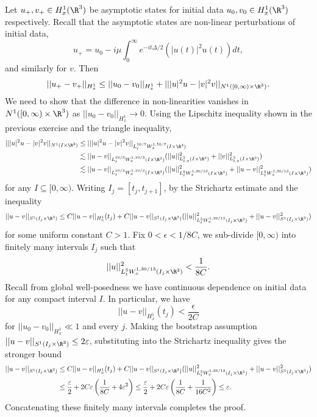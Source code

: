 \begin{solution}
	Let $u_+, v_+ \in H^1_x (\R^3)$ be asymptotic states for initial data $u_0, v_0 \in H^1_x (\R^3)$ respectively. Recall that the asymptotic states are non-linear perturbations of initial data,
		\[ u_+ = u_0 - i \mu \int_0^\infty e^{-it \Delta/2} (|u(t)|^2 u(t)) dt,\]
	and similarly for $v$. Then 
		\[ ||u_+ - v_+||_{H^1_x} \leq ||u_0 - v_0||_{H^1_x} + |||u|^2 u - |v|^2 v||_{N^1 ([0, \infty) \times \R^3)}. \]		
	We need to show that the difference in non-linearities vanishes in $N^1 ([0, \infty) \times \R^3)$ as $||u_0 - v_0||_{H^1_x} \to 0$. Using the Lipschitz inequality shown in the previous exercise and the triangle inequality, 
			\begin{align*}
				|| |u|^2 u - |v|^2 v||_{N^1 (I \times \R^3)}
					&\leq || |u|^2 u - |v|^2 v||_{L^{10/7}_t W^{1, 10/7}_x (I \times \R^3)}\\
					&\lesssim ||u - v||_{L^{10/3}_t W^{1, 10/3}_x (I \times \R^3)} (||u||^2_{L^5_{t, x}  (I \times \R^3)} + ||v||^2_{L^5_{t, x}  (I \times \R^3)} ) \\
					&\lesssim ||u - v||_{L^{10/3}_t W^{1, 10/3}_x (I \times \R^3)} (||u||^2_{L^5_{t} W^{1, 30/13}_x  (I \times \R^3)} + ||u - v||^2_{L^5_{t} W^{1, 30/13}_x  (I \times \R^3)} ) 
			\end{align*}		
	for any $I \subseteq [0, \infty)$. Writing $I_j = [t_j, t_{j + 1}]$, by the Strichartz estimate and the inequality
		\[ ||u - v||_{S^1 (I_j \times \R^3)} \leq C ||u - v||_{H^1_x} (t_j) + C ||u - v||_{S^1 (I_j \times \R^3)} (||u||^2_{L^5_t W^{1, 30/13}_x (I_j\times \R^3)} + ||u - v||^2_{S^1(I_j \times \R^3)}) \]
	for some uniform constant $C > 1$. Fix $0 < \epsilon < 1/8C$, we sub-divide $[0, \infty)$ into finitely many intervals $I_j$ such that
		\[ ||u||^2_{L^5_{t} W^{1, 30/13}_x  (I_j \times \R^3)} < \frac{1}{8C}.\]
	Recall from global well-posedness we have continuous dependence on initial data for any compact interval $I$. In particular, we have
		\[ ||u - v||_{H^1_x} (t_j) < \frac{\epsilon}{2C} \]
	for $||u_0 - v_0||_{H^1_x} \ll 1$ and every $j$. Making the bootstrap assumption $||u - v||_{S^1 (I_j \times \R^3)} \leq 2 \epsilon$, substituting into the Strichartz inequality gives the stronger bound
		\begin{align*}
			  ||u - v||_{S^1 (I_j \times \R^3)} 
			  	&\leq C ||u - v||_{H^1_x} (t_j) + C ||u - v||_{S^1 (I_j \times \R^3)} (||u||^2_{L^5_t W^{1, 30/13}_x (I_j\times \R^3)} + ||u - v||^2_{S^1(I_j \times \R^3)}) \\
			  &\leq \frac{\epsilon}{2} + 2C\epsilon \left( \frac{1}{8C} + 4\epsilon^2 \right)	 \leq \frac{\epsilon}{2} + 2 C \epsilon \left( \frac{1}{8C} + \frac{1}{16 C^2} \right) \leq \epsilon.
		\end{align*}	 
	Concatenating these finitely many intervals completes the proof. 
\end{solution}

